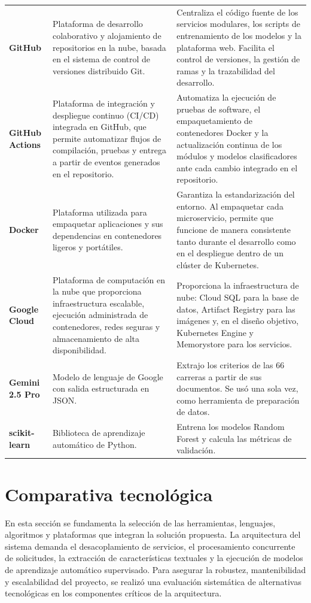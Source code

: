 \begin{longtable}{ L{0.17\textwidth} L{0.33\textwidth} L{0.42\textwidth} }
\textbf{GitHub} & Plataforma de desarrollo colaborativo y alojamiento de repositorios en la nube, basada en el sistema de control de versiones distribuido Git. & Centraliza el código fuente de los servicios modulares, los scripts de entrenamiento de los modelos y la plataforma web. Facilita el control de versiones, la gestión de ramas y la trazabilidad del desarrollo. \\
\textbf{GitHub Actions} & Plataforma de integración y despliegue continuo (CI/CD) integrada en GitHub, que permite automatizar flujos de compilación, pruebas y entrega a partir de eventos generados en el repositorio. & Automatiza la ejecución de pruebas de software, el empaquetamiento de contenedores Docker y la actualización continua de los módulos y modelos clasificadores ante cada cambio integrado en el repositorio. \\
\textbf{Docker} & Plataforma utilizada para empaquetar aplicaciones y sus dependencias en contenedores ligeros y portátiles. & Garantiza la estandarización del entorno. Al empaquetar cada microservicio, permite que funcione de manera consistente tanto durante el desarrollo como en el despliegue dentro de un clúster de Kubernetes. \\
\textbf{Google Cloud} & Plataforma de computación en la nube que proporciona infraestructura escalable, ejecución administrada de contenedores, redes seguras y almacenamiento de alta disponibilidad. & Proporciona la infraestructura de nube: Cloud SQL para la base de datos, Artifact Registry para las imágenes y, en el diseño objetivo, Kubernetes Engine y Memorystore para los servicios. \\
\textbf{Gemini 2.5 Pro} & Modelo de lenguaje de Google con salida estructurada en JSON. & Extrajo los criterios de las 66 carreras a partir de sus documentos. Se usó una sola vez, como herramienta de preparación de datos. \\
\textbf{scikit-learn} & Biblioteca de aprendizaje automático de Python. & Entrena los modelos Random Forest y calcula las métricas de validación. \\
\end{longtable}

\section{Comparativa tecnológica}
En esta sección se fundamenta la selección de las herramientas, lenguajes, algoritmos y plataformas que integran la solución propuesta. La arquitectura del sistema demanda el desacoplamiento de servicios, el procesamiento concurrente de solicitudes, la extracción de características textuales y la ejecución de modelos de aprendizaje automático supervisado. Para asegurar la robustez, mantenibilidad y escalabilidad del proyecto, se realizó una evaluación sistemática de alternativas tecnológicas en los componentes críticos de la arquitectura.

